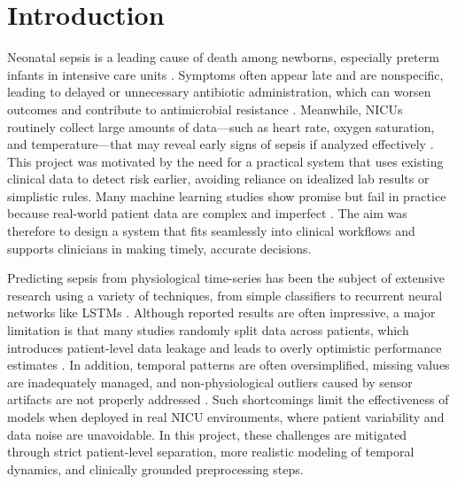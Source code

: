 \documentclass[conference]{IEEEtran}
\begin{document}
\section{Introduction}
Neonatal sepsis is a leading cause of death among newborns, especially preterm infants in intensive care units \cite{hero_monitoring,plos_ehr_sepsis}. Symptoms often appear late and are nonspecific, leading to delayed or unnecessary antibiotic administration, which can worsen outcomes and contribute to antimicrobial resistance \cite{vital_sign_ml}. Meanwhile, NICUs routinely collect large amounts of data—such as heart rate, oxygen saturation, and temperature—that may reveal early signs of sepsis if analyzed effectively  \cite{hero_monitoring}. This project was motivated by the need for a practical system that uses existing clinical data to detect risk earlier, avoiding reliance on idealized lab results or simplistic rules. Many machine learning studies show promise but fail in practice because real-world patient data are complex and imperfect  \cite{plos_ehr_sepsis,ehr_rnn_sepsis}. The aim was therefore to design a system that fits seamlessly into clinical workflows and supports clinicians in making timely, accurate decisions.



Predicting sepsis from physiological time-series has been the subject of extensive research using a variety of techniques, from simple classifiers to recurrent neural networks like LSTMs \cite{vital_sign_ml,ehr_rnn_sepsis}. Although reported results are often impressive, a major limitation is that many studies randomly split data across patients, which introduces patient-level data leakage and leads to overly optimistic performance estimates \cite{plos_ehr_sepsis}. In addition, temporal patterns are often oversimplified, missing values are inadequately managed, and non-physiological outliers caused by sensor artifacts are not properly addressed  \cite{cnn_psd_sepsis}. Such shortcomings limit the effectiveness of models when deployed in real NICU environments, where patient variability and data noise are unavoidable. In this project, these challenges are mitigated through strict patient-level separation, more realistic modeling of temporal dynamics, and clinically grounded preprocessing steps.
\end{document}
